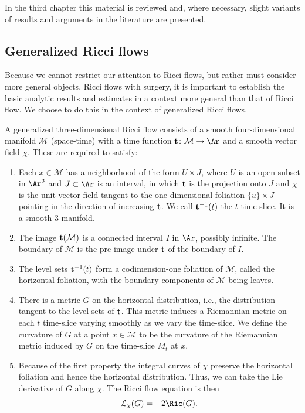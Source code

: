 In the third chapter this material is reviewed and, where necessary,
slight variants of results and arguments in the literature are
presented.


\subsection{Generalized Ricci flows}

Because we cannot restrict our attention to Ricci flows, but rather
must consider more general objects, Ricci flows with surgery, it is
important to establish the basic analytic results and estimates in a
context more general than that of Ricci flow. We choose to do this
in the context of generalized Ricci flows.

A generalized three-dimensional Ricci flow consists of a smooth
four-dimensional manifold ${\mathcal M}$ (space-time) with a time function ${\bf t}\colon {\mathcal M}\to \Ar$
and a smooth vector field $\chi$. These are required to satisfy:
\begin{enumerate}
\item Each $x\in {\mathcal M}$ has a neighborhood of the form
$U\times J$, where $U$ is an open subset in $\Ar^3$ and $J\subset
\Ar$ is an interval, in which ${\bf t}$ is the projection onto $J$
and $\chi$ is the unit vector field tangent to the one-dimensional
foliation $\{u\}\times J$ pointing in the direction of increasing
${\bf t}$. We call ${\bf t}^{-1}(t)$ the $t$ time-slice. It is a
smooth $3$-manifold.
\item The image ${\bf t}({\mathcal M})$ is a connected interval $I$ in
$\Ar$, possibly infinite. The boundary of ${\mathcal M}$ is the
pre-image under ${\bf t}$ of the boundary of $I$.
\item The level sets ${\bf t}^{-1}(t)$ form a codimension-one foliation of
${\mathcal M}$, called the horizontal foliation, with the boundary
components of ${\mathcal M}$ being leaves.
\item There is a metric $G$ on the horizontal distribution, i.e., the distribution
tangent to the level sets of ${\bf t}$. This metric induces a
Riemannian metric on each $t$ time-slice varying smoothly as we vary
the time-slice. We define the curvature of $G$ at a point
$x\in{\mathcal M}$ to be the curvature of the Riemannian metric
induced by $G$ on the time-slice $M_t$ at $x$.
\item Because of the first property the integral curves of $\chi$
preserve the horizontal foliation and hence the horizontal
distribution. Thus, we can take the Lie derivative of $G$ along
$\chi$. The Ricci flow equation is then
$${\mathcal L}_\chi(G)=-2\Ric(G).$$
\end{enumerate}


